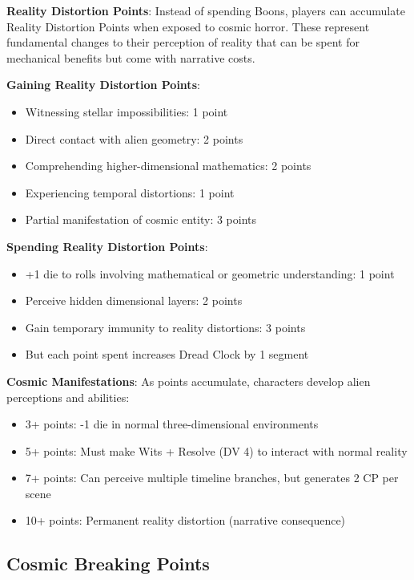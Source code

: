 \documentclass[11pt]{article}
\begin{document}
\begin{mdframed}[backgroundcolor=sanitybg]
\textbf{Reality Distortion Points}: Instead of spending Boons, players can accumulate Reality Distortion Points when exposed to cosmic horror. These represent fundamental changes to their perception of reality that can be spent for mechanical benefits but come with narrative costs.

\textbf{Gaining Reality Distortion Points}:
\begin{itemize}[leftmargin=*]
\item Witnessing stellar impossibilities: 1 point
\item Direct contact with alien geometry: 2 points
\item Comprehending higher-dimensional mathematics: 2 points
\item Experiencing temporal distortions: 1 point
\item Partial manifestation of cosmic entity: 3 points
\end{itemize}

\textbf{Spending Reality Distortion Points}:
\begin{itemize}[leftmargin=*]
\item +1 die to rolls involving mathematical or geometric understanding: 1 point
\item Perceive hidden dimensional layers: 2 points
\item Gain temporary immunity to reality distortions: 3 points
\item But each point spent increases Dread Clock by 1 segment
\end{itemize}

\textbf{Cosmic Manifestations}: As points accumulate, characters develop alien perceptions and abilities:
\begin{itemize}[leftmargin=*]
\item 3+ points: -1 die in normal three-dimensional environments
\item 5+ points: Must make Wits + Resolve (DV 4) to interact with normal reality
\item 7+ points: Can perceive multiple timeline branches, but generates 2 CP per scene
\item 10+ points: Permanent reality distortion (narrative consequence)
\end{itemize}
\end{mdframed}

\subsection*{Cosmic Breaking Points}
\end{document}
